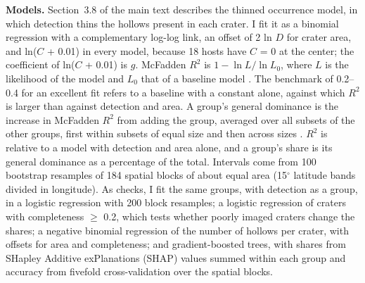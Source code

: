 \documentclass{planetary}
\begin{document}
\textbf{Models.} Section~3.8 of the main text describes the thinned occurrence model, in which detection thins the hollows present in each crater. I fit it as a binomial regression with a complementary log-log link, an offset of 2 ln $D$ for crater area, and ln($C$ + 0.01) in every model, because 18 hosts have $C$ = 0 at the center; the coefficient of ln($C$ + 0.01) is $g$. McFadden $R^2$ is $1 - \ln L/\ln L_0$, where $L$ is the likelihood of the model and $L_0$ that of a baseline model \parencite{mcfadden1974}. The benchmark of 0.2--0.4 for an excellent fit \parencite{mcfadden1977} refers to a baseline with a constant alone, against which $R^2$ is larger than against detection and area. A group's general dominance is the increase in McFadden $R^2$ from adding the group, averaged over all subsets of the other groups, first within subsets of equal size and then across sizes \parencite{azen2003,azen2009}. $R^2$ is relative to a model with detection and area alone, and a group's share is its general dominance as a percentage of the total. Intervals come from 100 bootstrap resamples of 184 spatial blocks of about equal area (15$^\circ$ latitude bands divided in longitude). As checks, I fit the same groups, with detection as a group, in a logistic regression with 200 block resamples; a logistic regression of craters with completeness $\geq$ 0.2, which tests whether poorly imaged craters change the shares; a negative binomial regression of the number of hollows per crater, with offsets for area and completeness; and gradient-boosted trees, with shares from SHapley Additive exPlanations (SHAP) values summed within each group and accuracy from fivefold cross-validation over the spatial blocks.
\end{document}
